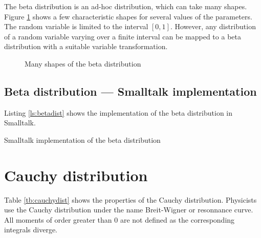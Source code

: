 \documentclass[twoside]{book}
\begin{document}
The beta distribution is an ad-hoc distribution, which can take
many shapes. Figure \ref{fig:betaDistr} shows a few characteristic
shapes for several values of the parameters. The random variable
is limited to the interval $\left[0,1\right]$. However, any
distribution of a random variable varying over a finite interval
can be mapped to a beta distribution with a suitable variable
transformation.
\begin{figure}
\center{}
\caption{Many shapes of the beta
distribution}\label{fig:betaDistr}
\end{figure}


\subsection{Beta distribution --- Smalltalk  implementation}
Listing \ref{ls:betadist} shows the implementation of the beta
distribution in Smalltalk.

\begin{listing} Smalltalk implementation of the beta distribution \label{ls:betadist}

\end{listing}


\section{Cauchy distribution}
\label{sec:cauchydist} Table \ref{tb:cauchydist} shows the
properties of the Cauchy distribution. Physicists use the Cauchy
distribution under the name Breit-Wigner or resonnance curve. All
moments of order greater than 0 are not defined as the
corresponding integrals diverge.
\end{document}
